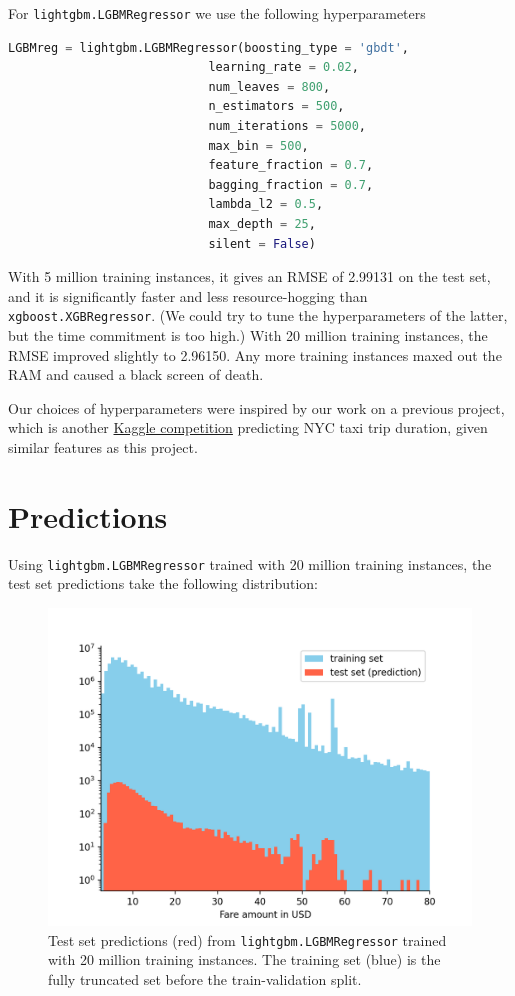 \documentclass[12pt,letterpaper,final]{article}
\numberwithin{equation}{section}
\begin{document}
For \verb|lightgbm.LGBMRegressor| we use the following hyperparameters
\begin{lstlisting}[language=Python, basicstyle=\footnotesize]
LGBMreg = lightgbm.LGBMRegressor(boosting_type = 'gbdt', 
                            learning_rate = 0.02, 
                            num_leaves = 800,
                            n_estimators = 500, 
                            num_iterations = 5000, 
                            max_bin = 500, 
                            feature_fraction = 0.7, 
                            bagging_fraction = 0.7,
                            lambda_l2 = 0.5,
                            max_depth = 25,
                            silent = False)
\end{lstlisting}
With 5 million training instances, it gives an RMSE of 2.99131 on the test set, and it is significantly faster and less resource-hogging than \verb|xgboost.XGBRegressor|. (We could try to tune the hyperparameters of the latter, but the time commitment is too high.) With 20 million training instances, the RMSE improved slightly to 2.96150. Any more training instances maxed out the RAM and caused a black screen of death.

Our choices of hyperparameters were inspired by our work on a previous project, which is another \href{https://www.kaggle.com/c/nyc-taxi-trip-duration/overview}{Kaggle competition} predicting NYC taxi trip duration, given similar features as this project.

\vspace*{-12pt}

\section{Predictions}

Using \verb|lightgbm.LGBMRegressor| trained with 20 million training instances, the test set predictions take the following distribution:

\begin{figure}[H]
\begin{center}
\includegraphics[trim={0 0 0 10}, clip, width=0.7\linewidth,keepaspectratio]{plots/fare_amount_trains_vs_test_predict_hist_20M_LGBM.png}
\caption{Test set predictions (red) from \texttt{lightgbm.LGBMRegressor} trained with 20 million training instances. The training set (blue) is the fully truncated set before the train-validation split.}\label{pred}
\end{center}
\end{figure}
\end{document}

